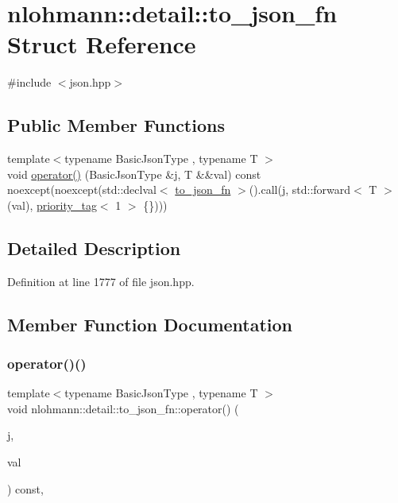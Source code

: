 \hypertarget{structnlohmann_1_1detail_1_1to__json__fn}{}\section{nlohmann\+:\+:detail\+:\+:to\+\_\+json\+\_\+fn Struct Reference}
\label{structnlohmann_1_1detail_1_1to__json__fn}


{\ttfamily \#include $<$json.\+hpp$>$}

\subsection*{Public Member Functions}
\begin{DoxyCompactItemize}
\item 
{\footnotesize template$<$typename Basic\+Json\+Type , typename T $>$ }\\void \hyperlink{structnlohmann_1_1detail_1_1to__json__fn_ac63f82d3eed085522f1cbe99a521a4d4}{operator()} (Basic\+Json\+Type \&j, T \&\&val) const noexcept(noexcept(std\+::declval$<$ \hyperlink{structnlohmann_1_1detail_1_1to__json__fn}{to\+\_\+json\+\_\+fn} $>$().call(j, std\+::forward$<$ T $>$(val), \hyperlink{structnlohmann_1_1detail_1_1priority__tag}{priority\+\_\+tag}$<$ 1 $>$ \{\})))
\end{DoxyCompactItemize}


\subsection{Detailed Description}


Definition at line 1777 of file json.\+hpp.



\subsection{Member Function Documentation}
\mbox{\label{structnlohmann_1_1detail_1_1to__json__fn_ac63f82d3eed085522f1cbe99a521a4d4}} 
\subsubsection{\texorpdfstring{operator()()}{operator()()}}
{\footnotesize\ttfamily template$<$typename Basic\+Json\+Type , typename T $>$ \\
void nlohmann\+::detail\+::to\+\_\+json\+\_\+fn\+::operator() (\begin{DoxyParamCaption}\item[{Basic\+Json\+Type \&}]{j,  }\item[{T \&\&}]{val }\end{DoxyParamCaption}) const\hspace{0.3cm}{\ttfamily [inline]}, {\ttfamily [noexcept]}}



